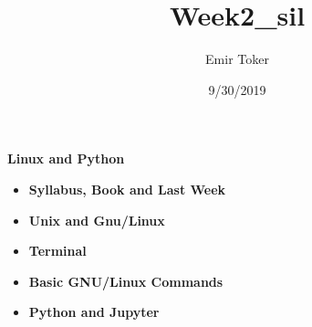 \documentclass[ignorenonframetext,]{beamer}
\title{Week2\_sil}
\author{Emir Toker}
\date{9/30/2019}
\begin{document}
\frame{\titlepage}

\begin{frame}

\begin{block}{\textbf{Linux and Python}}

\begin{itemize}
\item
  \textbf{Syllabus, Book and Last Week}
\item
  \textbf{Unix and Gnu/Linux}
\item
  \textbf{Terminal}
\item
  \textbf{Basic GNU/Linux Commands}
\item
  \textbf{Python and Jupyter}
\end{itemize}

\end{block}

\end{frame}
\end{document}
